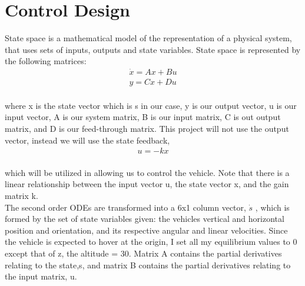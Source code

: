 \documentclass[a4paper,12pt]{article}
\begin{document}
\section{Control Design}
State space is a mathematical model of the representation of a physical system, that uses sets of inputs, outputs and state variables. State space is represented by the following matrices:
\begin{align*}
\dot{x} = Ax + Bu \\
y = Cx + Du
\end{align*} \\
where x is the state vector which is s in our case, y is our output vector, u is our input vector, A is our system matrix, B is our input matrix, C is out output matrix, and D is our feed-through matrix. This project will not use the output vector, instead we will use the state feedback, \\
\begin{align}
    u = -kx
\end{align}\\
which will be utilized in allowing us to control the vehicle. Note that there is a linear relationship between the input vector u, the state vector x, and the gain matrix k. \\
The second order ODEs are transformed into a 6x1 column vector, $\dot{s}$ , which is formed by the set of state variables given: the vehicles vertical and horizontal position and orientation, and its respective angular and linear velocities. Since the vehicle is expected to hover at the origin, I set all my equilibrium values to 0 except that of z, the altitude = 30. Matrix A contains the partial derivatives relating to the state,s, and matrix B contains the partial derivatives relating to the input matrix, u.\\
\end{document}
